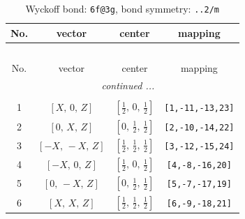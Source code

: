 \documentclass[fleqn,8pt]{jsarticle}
\begin{document}
\begin{longtable}{cccc}
\caption{Wyckoff bond: {\tt 6f@3g}, bond symmetry: {\tt ..2/m}}
 \\
 \hline \hline
No. & vector & center & mapping \\ \hline \endfirsthead

\multicolumn{3}{l}{\tablename\ \thetable{}} \\
 \hline \hline
No. & vector & center & mapping \\ \hline \endhead

 \hline \hline
\multicolumn{3}{r}{\footnotesize\it continued ...} \\ \endfoot

 \hline \hline
\multicolumn{3}{r}{} \\ \endlastfoot

1 & $\left[ X,\, 0,\, Z \right]$ & $\left[ \frac{1}{2},\, 0,\, \frac{1}{2} \right]$ & {\tt [1,-11,-13,23]} \\ \hline
2 & $\left[ 0,\, X,\, Z \right]$ & $\left[ 0,\, \frac{1}{2},\, \frac{1}{2} \right]$ & {\tt [2,-10,-14,22]} \\ \hline
3 & $\left[ - X,\, - X,\, Z \right]$ & $\left[ \frac{1}{2},\, \frac{1}{2},\, \frac{1}{2} \right]$ & {\tt [3,-12,-15,24]} \\ \hline
4 & $\left[ - X,\, 0,\, Z \right]$ & $\left[ \frac{1}{2},\, 0,\, \frac{1}{2} \right]$ & {\tt [4,-8,-16,20]} \\ \hline
5 & $\left[ 0,\, - X,\, Z \right]$ & $\left[ 0,\, \frac{1}{2},\, \frac{1}{2} \right]$ & {\tt [5,-7,-17,19]} \\ \hline
6 & $\left[ X,\, X,\, Z \right]$ & $\left[ \frac{1}{2},\, \frac{1}{2},\, \frac{1}{2} \right]$ & {\tt [6,-9,-18,21]} \\
\end{longtable}
\renewcommand{\arraystretch}{1.2}
\end{document}
